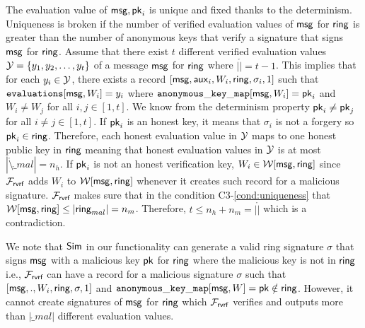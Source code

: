 	
	The evaluation value of $ \mathsf{msg}, \mathsf{pk}_i $ is unique and fixed thanks to the determinism. 
	Uniqueness is broken if the number of verified evaluation values of $ \mathsf{msg} $ for $ \mathsf{ring} $ is greater than the number of anonymous keys that verify a signature that signs $ \mathsf{msg} $ for $ \mathsf{ring} $.
	Assume that there exist $ t$ different verified evaluation values $ {\mathcal{Y}} = \{y_1, y_2, \ldots, y_t\} $ of a message $ \mathsf{msg} $ for $ \mathsf{ring} $ where $ |\ring| = t-1 $. This implies that for each $ y_i \in {\ensuremath{\mathcal{Y}}} $, there exists a  record $ [\mathsf{msg}, \mathsf{aux}_i, W_i,\mathsf{ring},\sigma_i,1] $ such that  $\texttt{evaluations}[\mathsf{msg},W_i] = y_i $ where $ \mathtt{anonymous\_key\_map}[\mathsf{msg},W_i] = \mathsf{pk}_i $ and $ W_i \neq W_j $ for all $ i,j \in [1,t] $. We know from the determinism property $ \mathsf{pk}_i \neq \mathsf{pk}_j $ for all $ i \neq j \in [1,t] $. 
	If $ \mathsf{pk}_i $ is an honest key, it means that $ \sigma_i $ is not a forgery so $ \mathsf{pk}_i \in \mathsf{ring} $. Therefore, each honest evaluation value  in $ {\mathcal{Y}} $ maps to one honest public key in $ \mathsf{ring} $ meaning that honest evaluation values in $ {\mathcal{Y}} $ is at most $ |\ring \setminus \ring_{mal}| = n_h $. If $ \mathsf{pk}_i $ is not an honest verification key, $ W_i \in \mathcal{W}[\mathsf{msg},\mathsf{ring}] $ since $ \mathcal{F}_{\textsf{rvrf}} $ adds $ W_i $ to $ \mathcal{W}[\mathsf{msg}, \mathsf{ring}] $ whenever it creates such record for a malicious signature. $ \mathcal{F}_{\textsf{rvrf}} $ makes sure that in the condition C3-\ref{cond:uniqueness} that $ \mathcal{W}[\mathsf{msg},\mathsf{ring}] \leq |\mathsf{ring}_{mal}| = n_m$. Therefore, $ t \leq n_h + n_m = |\ring| $ which is a contradiction.
	
	We note that $ \mathsf{Sim} $ in our functionality can generate a valid ring signature $ \sigma $ that signs $ \mathsf{msg} $ with a malicious key $ \mathsf{pk} $ for $ \mathsf{ring} $ where the malicious key is not in $ \mathsf{ring} $ i.e.,  $ \mathcal{F}_{\textsf{rvrf}} $  can have a record for a malicious signature $ \sigma $ such that $ [\mathsf{msg}, ., W_i,\mathsf{ring},\sigma,1] $ and $ \mathtt{anonymous\_key\_map}[\mathsf{msg},W]  = \mathsf{pk} \notin \mathsf{ring}$. However, it cannot create signatures of $ \mathsf{msg} $ for $ \mathsf{ring} $ which $ \mathcal{F}_{\textsf{rvrf}} $ verifies and outputs more than  $ |\ring_{mal}| $  different evaluation values.  
	
	
	
